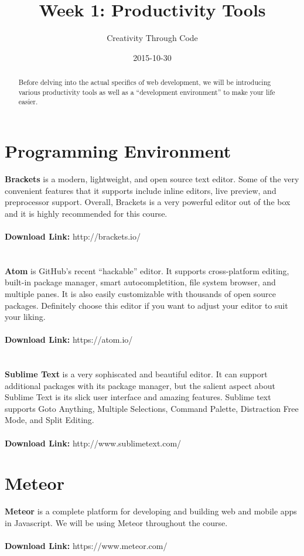 \documentclass[11pt, letterpaper]{article}
\title{Week 1: Productivity Tools}
\date{2015-10-30}
\author{Creativity Through Code}
\begin{document}
	\maketitle
	\newpage
	\begin{abstract}
		Before delving into the actual specifics of web development, we will be introducing various productivity tools as well as a ``development environment'' to make your life easier.
	\end{abstract}
	\section{Programming Environment}
		\textbf{Brackets} is a modern, lightweight, and open source text editor. Some of the very convenient features that it supports include inline editors, live preview, and preprocessor support. Overall, Brackets is a very powerful editor out of the box and it is highly recommended for this course.
		\\\\
		\textbf{Download Link:} http://brackets.io/
		\\\\\\
		\textbf{Atom} is GitHub's recent ``hackable'' editor. It supports cross-platform editing, built-in package manager, smart autocompletition, file system browser, and multiple panes. It is also easily customizable with thousands of open source packages. Definitely choose this editor if you want to adjust your editor to suit your liking.
		\\\\
		\textbf{Download Link:} https://atom.io/
		\\\\\\
		\textbf{Sublime Text} is a very sophiscated and beautiful editor. It can support additional packages with its package manager, but the salient aspect about Sublime Text is its slick user interface and amazing features. Sublime text supports Goto Anything, Multiple Selections, Command Palette, Distraction Free Mode, and Split Editing.
		\\\\
		\textbf{Download Link:} http://www.sublimetext.com/ 
	\section{Meteor}
		\textbf{Meteor} is a complete platform for developing and building web and mobile apps in Javascript. We will be using Meteor throughout the course.
		\\\\
		\textbf{Download Link:} https://www.meteor.com/
\end{document}
